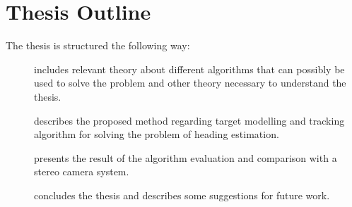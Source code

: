 \section{Thesis Outline}
The thesis is structured the following way:
\begin{description}
    \item[] includes relevant theory about different algorithms that can possibly be used to solve the problem and other theory necessary to understand the thesis.

    \item[] describes the proposed method regarding target modelling and tracking algorithm for solving the problem of heading estimation.

    \item[] presents the result of the algorithm evaluation and comparison with a stereo camera system.

    \item[] concludes the thesis and describes some suggestions for future work.
\end{description}
